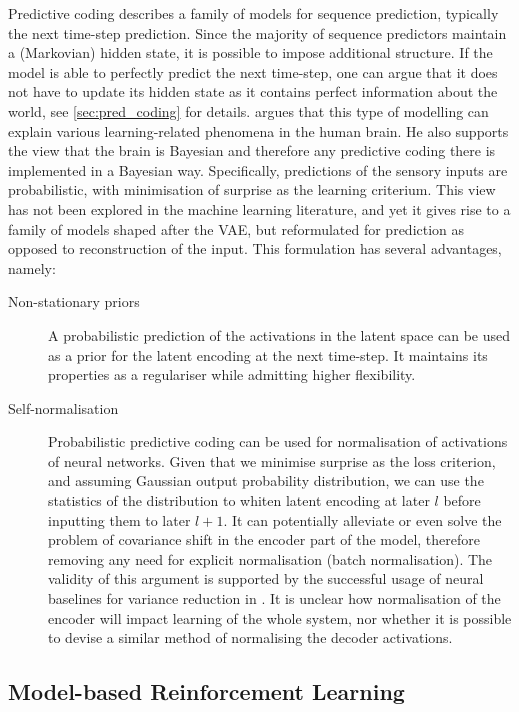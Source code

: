     Predictive coding describes a family of models for sequence prediction, typically the next time-step prediction. Since the majority of sequence predictors maintain a (Markovian) hidden state, it is possible to impose additional structure. If the model is able to perfectly predict the next time-step, one can argue that it does not have to update its hidden state as it contains perfect information about the world, see \cref{sec:pred_coding} for details. \cite{Friston2009guide} argues that this type of modelling can explain various learning-related phenomena in the human brain. He also supports the view that the brain is Bayesian and therefore any predictive coding there is implemented in a Bayesian way. Specifically, predictions of the sensory inputs are probabilistic, with minimisation of surprise as the learning criterium. This view has not been explored in the machine learning literature, and yet it gives rise to a family of models shaped after the VAE, but reformulated for prediction as opposed to reconstruction of the input. This formulation has several advantages, namely:
    \begin{description}
        \item[Non-stationary priors] A probabilistic prediction of the activations in the latent space can be used as a prior for the latent encoding at the next time-step. It maintains its properties as a regulariser while admitting higher flexibility.
        
        \item[Self-normalisation] Probabilistic predictive coding can be used for normalisation of activations of neural networks. Given that we minimise surprise as the loss criterion, and assuming Gaussian output probability distribution, we can use the statistics of the distribution to whiten latent encoding at later $l$ before inputting them to later $l+1$. It can potentially alleviate or even solve the problem of covariance shift in the encoder part of the model, therefore removing any need for explicit normalisation (\eg batch normalisation). The validity of this argument is supported by the successful usage of neural baselines for variance reduction in \cite{Mnih2014}. It is unclear how normalisation of the encoder will impact learning of the whole system, nor whether it is possible to devise a similar method of normalising the decoder activations.
    \end{description}

\subsection{Model-based Reinforcement Learning}


